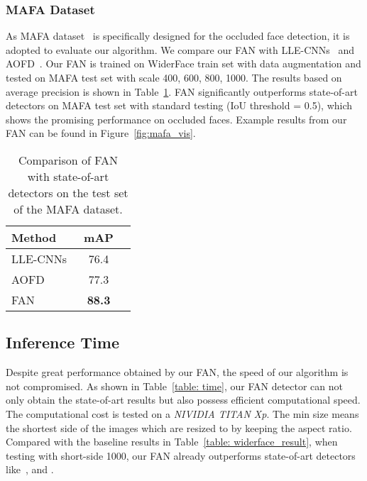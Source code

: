 \documentclass[10pt,twocolumn,letterpaper]{article}
\begin{document}
\subsubsection{MAFA Dataset} 
As MAFA dataset~\cite{Ge_2017_CVPR} is specifically designed for the occluded face detection, it is adopted to evaluate our algorithm. We compare our FAN with LLE-CNNs~\cite{Ge_2017_CVPR} and AOFD~\cite{chen2017masquer}. Our FAN is trained on WiderFace train set with data augmentation and tested on MAFA test set with scale {400, 600, 800, 1000}. The results based on average precision is shown in Table~\ref{table: mafa_result}. FAN significantly outperforms state-of-art detectors on MAFA test set with standard testing (IoU threshold = 0.5), which shows the promising performance on occluded faces. Example results from our FAN can be found in Figure~\ref{fig:mafa_vis}.

\begin{table}[t]
\begin{center}
\begin{tabular}{|l|c|c|}
\hline
Method & mAP \\
\hline
LLE-CNNs~\cite{Ge_2017_CVPR} & 76.4 \\
AOFD~\cite{chen2017masquer} & 77.3 \\
\hline
FAN & \textbf{88.3} \\
\hline
\end{tabular}
\end{center}
\caption{Comparison of FAN with state-of-art detectors on the test set of the MAFA dataset.}
\label{table: mafa_result}
\end{table}

\subsection{Inference Time}
Despite great performance obtained by our FAN, the speed of our algorithm is not compromised. As shown in Table~\ref{table: time}, our FAN detector can not only obtain the state-of-art results but also possess efficient computational speed. The computational cost is tested on a \emph{NIVIDIA TITAN Xp}. The min size  means the shortest side of the images which are resized to  by keeping the aspect ratio. Compared with the baseline results in Table~\ref{table: widerface_result}, when testing with short-side 1000, our FAN already outperforms state-of-art detectors like~\cite{najibi2017ssh}, \cite{zhang2017s3fd} and \cite{Hu_2017_CVPR}. 

\begin{table}[t]
\begin{center}
\end{center}
\caption{The inference time and precision with respect to different input sizes for our FAN.}
\label{table: time}
\end{table}
\end{document}
